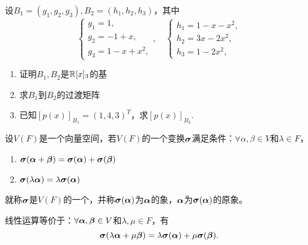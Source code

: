 \begin{frame}
  \begin{li}
    设$B_1=(g_1, g_2, g_3),B_2=(h_1, h_2, h_3)$，其中
    $$
    \left\{
      \begin{array}{l}
        g_1 = 1,\\
        g_2 = -1+x, \\
        g_3 = 1-x+x^2,
      \end{array}   
      \right., \quad
      \left\{
      \begin{array}{l}
        h_1 = 1-x-x^2,\\
        h_2 = 3x-2x^2, \\
        h_3 = 1-2x^2,
      \end{array}
    \right.
    $$
    \begin{enumerate}
    \item 证明$B_1,B_2$是$\mathbb R[x]_3$的基
    \item 求$B_1$到$B_2$的过渡矩阵
    \item 已知$[p(x)]_{B_1} = (1,4,3)^T$，求$[p(x)]_{B_2}$.
    \end{enumerate}
  \end{li}
\end{frame}

\begin{frame}
\begin{dingyi}[线性变换]
  设$V(F)$是一个向量空间，若$V(F)$的一个变换$\boldsymbol{\sigma}$满足条件：$\forall \alpha,\beta\in V$和$\lambda\in F$，
  \begin{enumerate}
    \item $\boldsymbol{\sigma}(\boldsymbol{\alpha}+\boldsymbol{\beta}) = \boldsymbol{\sigma}(\boldsymbol{\alpha}) + \boldsymbol{\sigma}(\boldsymbol{\beta})$\\[0.1in]
    \item $\boldsymbol{\sigma}(\lambda\boldsymbol{\alpha}) = \lambda\boldsymbol{\sigma}(\boldsymbol{\alpha})$
  \end{enumerate}
  就称$\boldsymbol{\sigma}$是$V(F)$的一个，并称$\boldsymbol{\sigma}(\boldsymbol{\alpha})$为$\boldsymbol{\alpha}$的象，$\boldsymbol{\alpha}$为$\boldsymbol{\sigma}(\boldsymbol{\alpha})$的原象。
\end{dingyi}
\vspace{.1in} 

线性运算等价于：$\forall \boldsymbol{\alpha},\boldsymbol{\beta}\in V$和$\lambda, \mu \in F$，有
$$
\boldsymbol{\sigma}(\lambda\boldsymbol{\alpha}+\mu\boldsymbol{\beta}) = \lambda\boldsymbol{\sigma}(\boldsymbol{\alpha})+\mu\boldsymbol{\sigma}(\boldsymbol{\beta}).
$$
\end{frame}

